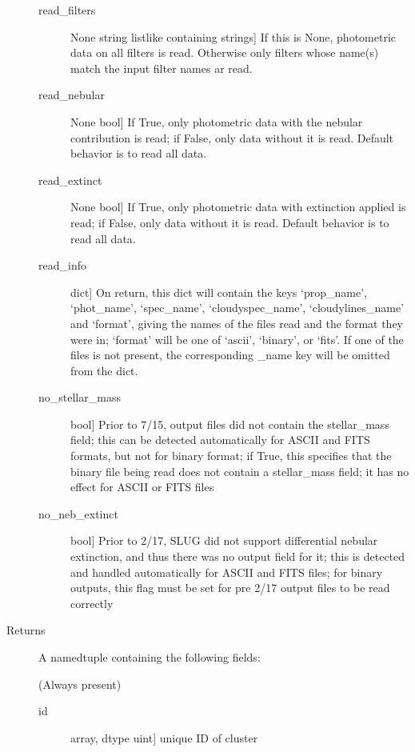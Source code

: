 \documentclass[letterpaper,10pt,english]{sphinxmanual}
\begin{document}
\begin{fulllineitems}
\begin{description}
\begin{description}
\item[{read\_filters}] \leavevmode{[}None \textbar{} string \textbar{} listlike containing strings{]}
If this is None, photometric data on all filters is
read. Otherwise only filters whose name(s) match the input
filter names ar read.

\item[{read\_nebular}] \leavevmode{[}None \textbar{} bool{]}
If True, only photometric data with the nebular contribution
is read; if False, only data without it is read. Default
behavior is to read all data.

\item[{read\_extinct}] \leavevmode{[}None \textbar{} bool{]}
If True, only photometric data with extinction applied is
read; if False, only data without it is read. Default
behavior is to read all data.

\item[{read\_info}] \leavevmode{[}dict{]}
On return, this dict will contain the keys ‘prop\_name’,
‘phot\_name’, ‘spec\_name’, ‘cloudyspec\_name’, ‘cloudylines\_name’
and ‘format’, giving the names of the files read and the format
they were in; ‘format’ will be one of ‘ascii’, ‘binary’, or
‘fits’. If one of the files is not present, the corresponding
\_name key will be omitted from the dict.

\item[{no\_stellar\_mass}] \leavevmode{[}bool{]}
Prior to 7/15, output files did not contain the stellar\_mass
field; this can be detected automatically for ASCII and FITS
formats, but not for binary format; if True, this specifies
that the binary file being read does not contain a
stellar\_mass field; it has no effect for ASCII or FITS files

\item[{no\_neb\_extinct}] \leavevmode{[}bool{]}
Prior to 2/17, SLUG did not support differential nebular
extinction, and thus there was no output field for it; this
is detected and handled automatically for ASCII and FITS
files; for binary outputs, this flag must be set for pre
2/17 output files to be read correctly

\end{description}

\item[{Returns}] \leavevmode
A namedtuple containing the following fields:

(Always present)
\begin{description}
\item[{id}] \leavevmode{[}array, dtype uint{]}
unique ID of cluster


\end{description}
\end{description}
\end{fulllineitems}
\end{document}
